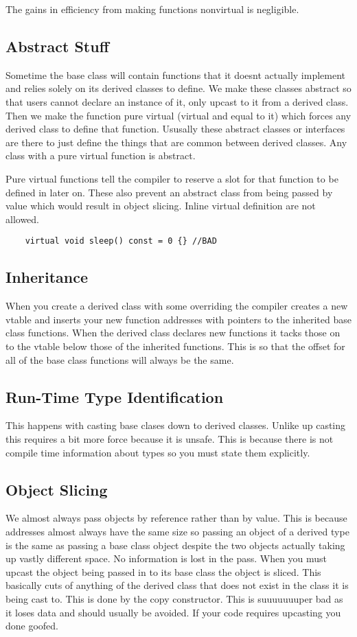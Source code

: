 \documentclass[12pt]{article}
\begin{document}
The gains in efficiency from making functions nonvirtual is negligible.

\subsection*{Abstract Stuff}
Sometime the base class will contain functions that it doesnt actually implement and relies solely on its derived classes to define. We make these classes abstract so that users cannot declare an instance of it, only upcast to it from a derived class. Then we make the function pure virtual (virtual and equal to it) which forces any derived class to define that function. Ususally these abstract classes or interfaces are there to just define the things that are common between derived classes. Any class with a pure virtual function is abstract.

Pure virtual functions tell the compiler to reserve a slot for that function to be defined in later on. These also prevent an abstract class from being passed by value which would result in object slicing. Inline virtual definition are not allowed.
\begin{lstlisting}
    virtual void sleep() const = 0 {} //BAD
\end{lstlisting}

\subsection*{Inheritance}
When you create a derived class with some overriding the compiler creates a new vtable and inserts your new function addresses with pointers to the inherited base class functions. When the derived class declares new functions it tacks those on to the vtable below those of the inherited functions. This is so that the offset for all of the base class functions will always be the same.

\subsection*{Run-Time Type Identification}
This happens with casting base clases down to derived classes. Unlike up casting this requires a bit more force because it is unsafe. This is because there is not compile time information about types so you must state them explicitly.

\subsection*{Object Slicing}
We almost always pass objects by reference rather than by value. This is because addresses almost always have the same size so passing an object of a derived type is the same as passing a base class object despite the two objects actually taking up vastly different space. No information is lost in the pass. When you must upcast the object being passed in to its base class the object is sliced. This basically cuts of anything of the derived class that does not exist in the class it is being cast to. This is done by the copy constructor. This is suuuuuuuper bad as it loses data and should usually be avoided. If your code requires upcasting you done goofed.
\end{document}
